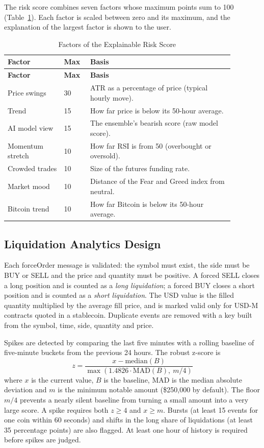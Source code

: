 The risk score combines seven factors whose maximum points sum to 100 (Table~\ref{tab:riskfactors}). Each factor is scaled between zero and its maximum, and the explanation of the largest factor is shown to the user.

{\renewcommand{\arraystretch}{1.25}
\begin{longtable}{|p{0.22\linewidth}|p{0.1\linewidth}|p{0.56\linewidth}|}
\caption{Factors of the Explainable Risk Score}\label{tab:riskfactors}\\\hline
\textbf{Factor} & \textbf{Max} & \textbf{Basis}\\\hline\endfirsthead
\hline\textbf{Factor} & \textbf{Max} & \textbf{Basis}\\\hline\endhead
Price swings & 30 & ATR as a percentage of price (typical hourly move).\\\hline
Trend & 15 & How far price is below its 50-hour average.\\\hline
AI model view & 15 & The ensemble's bearish score (raw model score).\\\hline
Momentum stretch & 10 & How far RSI is from 50 (overbought or oversold).\\\hline
Crowded trades & 10 & Size of the futures funding rate.\\\hline
Market mood & 10 & Distance of the Fear and Greed index from neutral.\\\hline
Bitcoin trend & 10 & How far Bitcoin is below its 50-hour average.\\\hline
\end{longtable}}

\subsection{Liquidation Analytics Design}
Each forceOrder message is validated: the symbol must exist, the side must be BUY or SELL and the price and quantity must be positive. A forced SELL closes a long position and is counted as a \textit{long liquidation}; a forced BUY closes a short position and is counted as a \textit{short liquidation}. The USD value is the filled quantity multiplied by the average fill price, and is marked valid only for USD-M contracts quoted in a stablecoin. Duplicate events are removed with a key built from the symbol, time, side, quantity and price.

Spikes are detected by comparing the last five minutes with a rolling baseline of five-minute buckets from the previous 24 hours. The robust z-score is
\begin{equation}
z = \frac{x - \mathrm{median}(B)}{\max\left(1.4826 \cdot \mathrm{MAD}(B),\ m/4\right)}
\end{equation}
where $x$ is the current value, $B$ is the baseline, MAD is the median absolute deviation \cite{rousseeuw1993} and $m$ is the minimum notable amount (\$250{,}000 by default). The floor $m/4$ prevents a nearly silent baseline from turning a small amount into a very large score. A spike requires both $z \ge 4$ and $x \ge m$. Bursts (at least 15 events for one coin within 60 seconds) and shifts in the long share of liquidations (at least 35 percentage points) are also flagged. At least one hour of history is required before spikes are judged.

